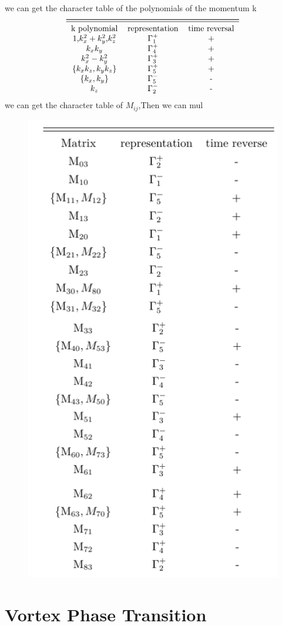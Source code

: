 \documentclass[5pt]{article}
\begin{document}
we can get the character table of the polynomials
of the momentum k
\begin{align}
	\nonumber
	\begin{tabular}{ccc}
		\toprule
		\midrule
		k polynomial & representation & time reversal \\
		1,$k_x^2+k_y^2$,$k_z^2$ &$\Gamma_1^{+}$&+\\
		$k_xk_y$&$\Gamma_4^{+}$&+\\
		$k_x^2-k_y^2$&$\Gamma_3^{+}$&+\\
		$\{k_xk_z,k_yk_z\}$&$\Gamma_5^{+}$&+\\
		$\{k_x,k_y\}$&$\Gamma_5^{-}$&-\\
		$k_z$&$\Gamma_2^{-}$&-
	\end{tabular}
\end{align}
we can get the character table of $M_{ij}$,Then we can mul

\begin{figure}[H]
	\centering
	\includegraphics[scale=0.8]{figure/2}
	\caption{}
	\label{}
\end{figure}




\section{Vortex Phase Transition}
\end{document}
